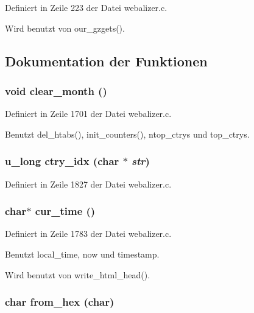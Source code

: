Definiert in Zeile 223 der Datei webalizer.c.

Wird benutzt von our\_\-gzgets().

\subsection{Dokumentation der Funktionen}
\subsubsection{\setlength{\rightskip}{0pt plus 5cm}void clear\_\-month ()}\label{webalizer_8c_3d6b75394204fbb3dbe30423911cda44}




Definiert in Zeile 1701 der Datei webalizer.c.

Benutzt del\_\-htabs(), init\_\-counters(), ntop\_\-ctrys und top\_\-ctrys.
\subsubsection{\setlength{\rightskip}{0pt plus 5cm}u\_\-long ctry\_\-idx (char $\ast$ {\em str})}\label{webalizer_8c_154bd0b4bda40aa5c99d7cf79886d400}




Definiert in Zeile 1827 der Datei webalizer.c.
\subsubsection{\setlength{\rightskip}{0pt plus 5cm}char$\ast$ cur\_\-time ()}\label{webalizer_8c_f6fc05ecb3c962ea69fac0a9ce9525d7}




Definiert in Zeile 1783 der Datei webalizer.c.

Benutzt local\_\-time, now und timestamp.

Wird benutzt von write\_\-html\_\-head().
\subsubsection{\setlength{\rightskip}{0pt plus 5cm}char from\_\-hex (char)}\label{webalizer_8c_9f2fa07c0c39a7caed8e40eaf1c2fa96}




